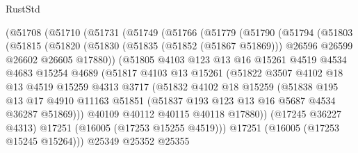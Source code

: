 \begin{lexlean}{RustStd}
\begin{coremodule}
        (@51708
          (@51710
            (@51731
              (@51749
                (@51766
                  (@51779
                    (@51790
                      (@51794
                        (@51803
                          (@51815
                            (@51820
                              (@51830
                                (@51835 (@51852 (@51867 @51869)))
                                @26596
                                @26599
                                @26602
                                @26605
                                @17880))
                            (@51805
                              @4103
                              @123
                              @13
                              @16
                              @15261
                              @4519
                              @4534
                              @4683
                              @15254
                              @4689
                              (@51817
                                @4103
                                @13
                                @15261
                                (@51822
                                  @3507
                                  @4102
                                  @18
                                  @13
                                  @4519
                                  @15259
                                  @4313
                                  @3717
                                  (@51832
                                    @4102
                                    @18
                                    @15259
                                    (@51838
                                      @195
                                      @13
                                      @17
                                      @4910
                                      @11163
                                      @51851
                                      (@51837 @193 @123 @13 @16 @5687 @4534 @36287 @51869)))
                                  @40109
                                  @40112
                                  @40115
                                  @40118
                                  @17880))
                              (@17245 @36227 @4313)
                              @17251
                              (@16005 (@17253 @15255 @4519)))
                            @17251
                            (@16005 (@17253 @15245 @15264)))
                          @25349
                          @25352
                          @25355

\end{coremodule}
\end{lexlean}
